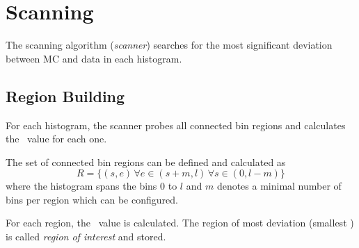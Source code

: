 \section{Scanning}
The scanning algorithm (\emph{scanner}) searches for the most significant deviation between MC and data in each histogram.

\subsection{Region Building}
For each histogram, the scanner probes all connected bin regions and calculates the \p~value for each one.

The set of connected bin regions can be defined and calculated as
\begin{equation}
R = \{(s, e) \, \forall e \in (s + m, l) \, \forall s \in (0, l-m)\}
\end{equation}
where the histogram spans the bins $0$ to $l$ and $m$ denotes a minimal number of bins per region which can be configured.

For each region, the \p~value is calculated. The region of most deviation (smallest \p) is called \emph{region of interest} and stored.

